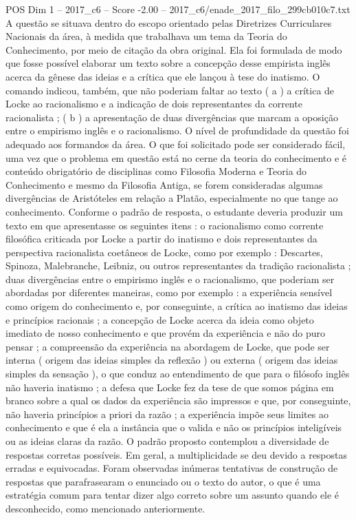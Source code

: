 \begin{textsample}{POS Dim 1 – 2017\_c6 – Score -2.00 – 2017\_c6/enade\_2017\_filo\_299cb010c7.txt}
A questão se situava dentro do escopo orientado pelas Diretrizes Curriculares Nacionais da área, à medida que trabalhava um tema da Teoria do Conhecimento, por meio de citação da obra original.
Ela foi formulada de modo que fosse possível elaborar um texto sobre a concepção desse empirista inglês acerca da gênese das ideias e a crítica que ele lançou à tese do inatismo.
O comando indicou, também, que não poderiam faltar ao texto ( a ) a crítica de Locke ao racionalismo e a indicação de dois representantes da corrente racionalista ; ( b ) a apresentação de duas divergências que marcam a oposição entre o empirismo inglês e o racionalismo.
O nível de profundidade da questão foi adequado aos formandos da área.
O que foi solicitado pode ser considerado fácil, uma vez que o problema em questão está no cerne da teoria do conhecimento e é conteúdo obrigatório de disciplinas como Filosofia Moderna e Teoria do Conhecimento e mesmo da Filosofia Antiga, se forem consideradas algumas divergências de Aristóteles em relação a Platão, especialmente no que tange ao conhecimento.
Conforme o padrão de resposta, o estudante deveria produzir um texto em que apresentasse os seguintes itens : o racionalismo como corrente filosófica criticada por Locke a partir do inatismo e dois representantes da perspectiva racionalista coetâneos de Locke, como por exemplo : Descartes, Spinoza, Malebranche, Leibniz, ou outros representantes da tradição racionalista ; duas divergências entre o empirismo inglês e o racionalismo, que poderiam ser abordadas por diferentes maneiras, como por exemplo : a experiência sensível como origem do conhecimento e, por conseguinte, a crítica ao inatismo das ideias e princípios racionais ; a concepção de Locke acerca da ideia como objeto imediato de nosso conhecimento e que provém da experiência e não do puro pensar ; a compreensão da experiência na abordagem de Locke, que pode ser interna ( origem das ideias simples da reflexão ) ou externa ( origem das ideias simples da sensação ), o que conduz ao entendimento de que para o filósofo inglês não haveria inatismo ; a defesa que Locke fez da tese de que somos página em branco sobre a qual os dados da experiência são impressos e que, por conseguinte, não haveria princípios a priori da razão ; a experiência impõe seus limites ao conhecimento e que é ela a instância que o valida e não os princípios inteligíveis ou as ideias claras da razão.
O padrão proposto contemplou a diversidade de respostas corretas possíveis.
Em geral, a multiplicidade se deu devido a respostas erradas e equivocadas.
Foram observadas inúmeras tentativas de construção de respostas que parafrasearam o enunciado ou o texto do autor, o que é uma estratégia comum para tentar dizer algo correto sobre um assunto quando ele é desconhecido, como mencionado anteriormente.

\end{textsample}
